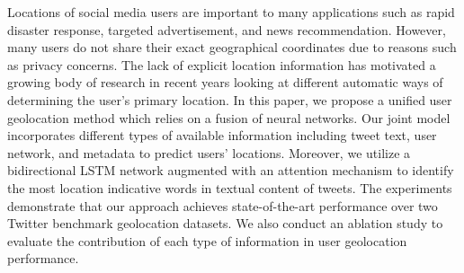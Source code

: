 Locations of social media users are important to many applications such as rapid disaster response, targeted advertisement, and news recommendation. However, many users do not share their exact geographical coordinates due to reasons such as privacy concerns. The lack of explicit location information has motivated a growing body of research in recent years looking at different automatic ways of determining the user's primary location. In this paper, we propose a unified user geolocation method which relies on a fusion of neural networks. Our joint model incorporates different types of available information including tweet text, user network, and metadata to predict users' locations. Moreover, we utilize a bidirectional LSTM network augmented with an attention mechanism to identify the most location indicative words in textual content of tweets. The experiments demonstrate that our approach achieves state-of-the-art performance over two Twitter benchmark geolocation datasets. We also conduct an ablation study to evaluate the contribution of each type of information in user geolocation performance.
